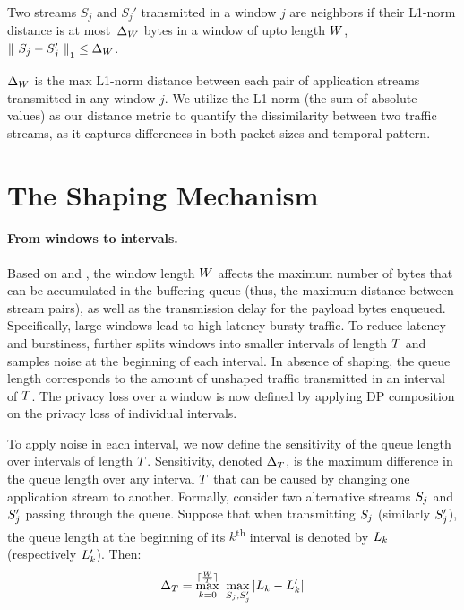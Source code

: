 \begin{definition}
Two streams $S_{j}$ and $S_{j}'$ transmitted in a window $j$
are neighbors
if their L1-norm distance is at most~$\Delta_{W}$ bytes in a window of upto length $W$, \ie ${\|~S_{j} - S_{j}'~\|}_1 \leq \Delta_{W}$.
\label{def:neighboring-streams}
\end{definition}

$\Delta_{W}$ is the max L1-norm distance between each pair of application streams transmitted in any window $j$.
We utilize the L1-norm (the sum of absolute values) as our distance metric to quantify the dissimilarity between two traffic streams, as it captures differences in both packet sizes and temporal pattern.


\section{The Shaping Mechanism}
\label{subsec:dp-shaping-mechanism}
\paragraph{From windows to intervals.}
Based on  and , the window length $W$ affects the maximum number of bytes that can be accumulated in the buffering queue (thus, the maximum distance between stream pairs), as well as the transmission delay for the payload bytes enqueued.
Specifically, large windows lead to high-latency bursty traffic.
To reduce latency and burstiness, {\sys} further splits windows into smaller intervals of length $T$ and samples noise at the beginning of each interval.
In absence of shaping, the queue length corresponds to the amount of unshaped traffic transmitted in an interval of $T$.
The privacy loss over a window is now defined by applying DP composition on the privacy loss of individual intervals.

To apply noise in each interval, we now define the sensitivity of the queue  length over intervals of length $T$.
Sensitivity, denoted $\Delta_T$, is the maximum difference in the queue length over any interval $T$ that can be caused by changing one application stream to another.
Formally, consider two alternative streams $S_{j}$ and $S_{j}'$ passing through the queue.
Suppose that when transmitting $S_{j}$ (similarly $S_{j}'$), the queue length at the beginning of its $k$\textsuperscript{th} interval is denoted by $L_{k}$ (respectively $L_{k}'$). Then:
\begin{equation}
    \Delta_T = \max_{k = 0}^{\lceil \frac{W}{T} \rceil}~\max_{S_{j},
        S_{j}'} | L_{k} - L_{k}' |
    \label{eqn:ssens}
\end{equation}



